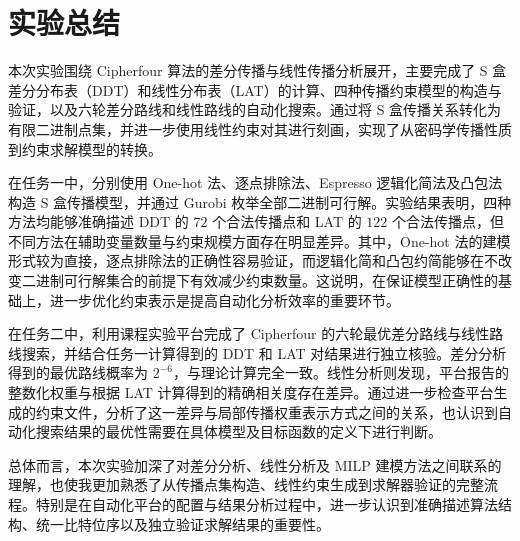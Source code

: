 
\clearpage
\section{实验总结}

本次实验围绕 Cipherfour 算法的差分传播与线性传播分析展开，主要完成了 S 盒差分分布表（DDT）和线性分布表（LAT）的计算、四种传播约束模型的构造与验证，以及六轮差分路线和线性路线的自动化搜索。通过将 S 盒传播关系转化为有限二进制点集，并进一步使用线性约束对其进行刻画，实现了从密码学传播性质到约束求解模型的转换。

在任务一中，分别使用 One-hot 法、逐点排除法、Espresso 逻辑化简法及凸包法构造 S 盒传播模型，并通过 Gurobi 枚举全部二进制可行解。实验结果表明，四种方法均能够准确描述 DDT 的 $72$ 个合法传播点和 LAT 的 $122$ 个合法传播点，但不同方法在辅助变量数量与约束规模方面存在明显差异。其中，One-hot 法的建模形式较为直接，逐点排除法的正确性容易验证，而逻辑化简和凸包约简能够在不改变二进制可行解集合的前提下有效减少约束数量。这说明，在保证模型正确性的基础上，进一步优化约束表示是提高自动化分析效率的重要环节。

在任务二中，利用课程实验平台完成了 Cipherfour 的六轮最优差分路线与线性路线搜索，并结合任务一计算得到的 DDT 和 LAT 对结果进行独立核验。差分分析得到的最优路线概率为 $2^{-6}$，与理论计算完全一致。线性分析则发现，平台报告的整数化权重与根据 LAT 计算得到的精确相关度存在差异。通过进一步检查平台生成的约束文件，分析了这一差异与局部传播权重表示方式之间的关系，也认识到自动化搜索结果的最优性需要在具体模型及目标函数的定义下进行判断。

总体而言，本次实验加深了对差分分析、线性分析及 MILP 建模方法之间联系的理解，也使我更加熟悉了从传播点集构造、线性约束生成到求解器验证的完整流程。特别是在自动化平台的配置与结果分析过程中，进一步认识到准确描述算法结构、统一比特位序以及独立验证求解结果的重要性。
